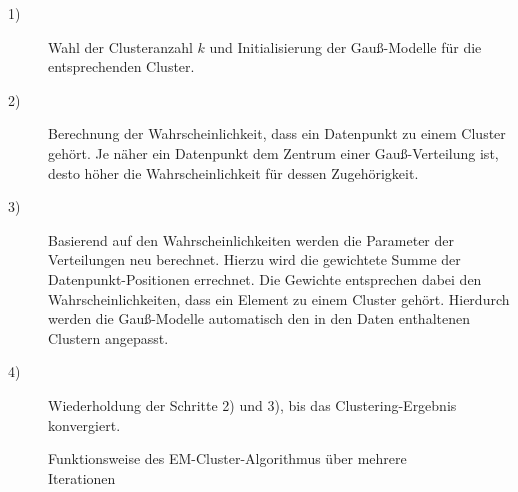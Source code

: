 \begin{description}
    \item[1)] Wahl der Clusteranzahl $k$ und Initialisierung der Gauß-Modelle für die entsprechenden Cluster.
    \item[2)] Berechnung der Wahrscheinlichkeit, dass ein Datenpunkt zu einem Cluster gehört. Je näher
              ein Datenpunkt dem Zentrum einer Gauß-Verteilung ist, desto höher die Wahrscheinlichkeit für dessen Zugehörigkeit.
    \item[3)] Basierend auf den Wahrscheinlichkeiten werden die Parameter der Verteilungen neu berechnet.
              Hierzu wird die gewichtete Summe der Datenpunkt-Positionen errechnet. Die Gewichte entsprechen dabei
              den Wahrscheinlichkeiten, dass ein Element zu einem Cluster gehört. Hierdurch werden die Gauß-Modelle automatisch
              den in den Daten enthaltenen Clustern angepasst.
    \item[4)] Wiederholdung der Schritte 2) und 3), bis das Clustering-Ergebnis konvergiert.
\end{description}

\begin{figure}[H]
    \centering
    \caption[Funktionsweise des EM-Cluster-Algorithmus]{Funktionsweise des EM-Cluster-Algorithmus über mehrere Iterationen \cite[]{GeorgeSeif2018}}
    \label{fig:grund_em_clustering}
\end{figure}

